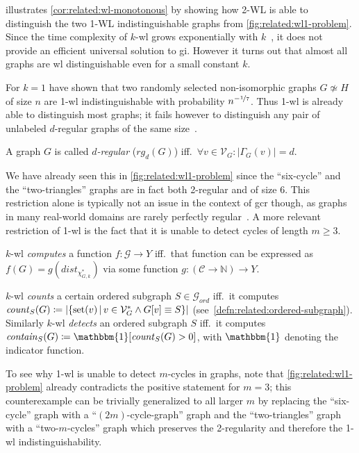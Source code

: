  illustrates \cref{cor:related:wl-monotonous} by showing how 2-WL is able to distinguish the two 1-WL indistinguishable graphs from \cref{fig:related:wl1-problem}.
Since the time complexity of $k$-\acs{wl} grows exponentially with $k$~\cite[cor.~1.9.7]{Immerman1990}, it does not provide an efficient universal solution to \ac{gi}.
However it turns out that almost all graphs are \ac{wl} distinguishable even for a small constant $k$.

For $k = 1$ \citet{Babai1980} have shown that two randomly selected non-isomorphic graphs $G \not\simeq H$ of size $n$ are 1-\acs{wl} indistinguishable with probability $n^{-\nicefrac{1}{7}}$.
Thus 1-\acs{wl} is already able to distinguish most graphs; it fails however to distinguish any pair of unlabeled $d$-regular graphs of the same size~\cite[cor.~1.8.5]{Immerman1990}.
\begin{defn}
	A graph $G$ is called \textit{$d$-regular} ($\mathit{rg}_d(G)$) iff.\ $\forall v \in \mathcal{V}_G: {|\Gamma_G(v)|} = d$.
\end{defn}
We have already seen this in \cref{fig:related:wl1-problem} since the ``six-cycle'' and the ``two-triangles'' graphs are in fact both 2-regular and of size 6.
This restriction alone is typically not an issue in the context of \ac{gcr} though, as graphs in many real-world domains are rarely perfectly regular~\cite{Abedijaberi2018}.
A more relevant restriction of 1-\acs{wl} is the fact that it is unable to detect cycles of length $m \geq 3$.
\begin{defn}\label{defn:related:wl-compute}
	$k$-\acs{wl} \textit{computes} a function $f: \mathcal{G} \to Y$ iff.\ that function can be expressed as $f(G) = g(\mathit{dist}_{\chi_{G, k}^{*}})$ via some function $g: (\mathcal{C} \to \mathbb{N}) \to Y$.
\end{defn}
\begin{defn}\label{defn:related:wl-count-detect}
	$k$-\acs{wl} \textit{counts} a certain ordered subgraph $S \in \mathcal{G}_{\mathit{ord}}$ iff.\ it computes $\mathit{count}_S(G) \coloneqq \left|\{ \operatorname{set}(v)\, |\, v \in \mathcal{V}_G^{*} \land G[v] \equiv S \}\right|$ (see~\cref{defn:related:ordered-subgraph}).
	Similarly $k$-\acs{wl} \textit{detects} an ordered subgraph $S$ iff.\ it computes $\mathit{contain}_S(G) \coloneqq \mathbbm{1}[\mathit{count}_S(G) > 0]$, with $\mathbbm{1}$ denoting the indicator function.
\end{defn}
To see why 1-\acs{wl} is unable to detect $m$-cycles in graphs, note that \cref{fig:related:wl1-problem} already contradicts the positive statement for $m = 3$;
this counterexample can be trivially generalized to all larger $m$ by replacing the ``six-cycle'' graph with a ``$(2m)$-cycle-graph'' graph and the ``two-triangles'' graph with a ``two-$m$-cycles'' graph which preserves the 2-regularity and therefore the 1-\acs{wl} indistinguishability.

